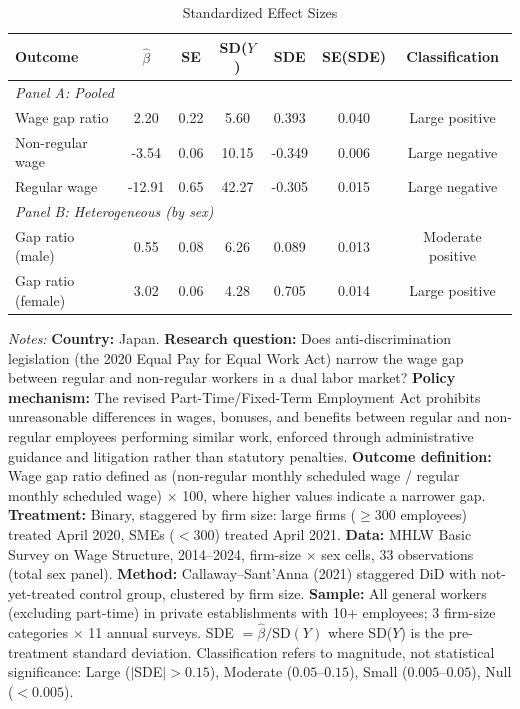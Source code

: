 \begin{table}[t]
\centering
\caption{Standardized Effect Sizes}
\label{tab:sde}
\begin{tabular}{lcccccc}
\toprule
Outcome & $\hat{\beta}$ & SE & SD($Y$) & SDE & SE(SDE) & Classification \\
\midrule
\multicolumn{7}{l}{\textit{Panel A: Pooled}} \\
Wage gap ratio & 2.20 & 0.22 & 5.60 & 0.393 & 0.040 & Large positive \\
Non-regular wage & -3.54 & 0.06 & 10.15 & -0.349 & 0.006 & Large negative \\
Regular wage & -12.91 & 0.65 & 42.27 & -0.305 & 0.015 & Large negative \\
\midrule
\multicolumn{7}{l}{\textit{Panel B: Heterogeneous (by sex)}} \\
Gap ratio (male) & 0.55 & 0.08 & 6.26 & 0.089 & 0.013 & Moderate positive \\
Gap ratio (female) & 3.02 & 0.06 & 4.28 & 0.705 & 0.014 & Large positive \\
\bottomrule
\end{tabular}
\begin{tablenotes}
\item \textit{Notes:} \textbf{Country:} Japan. \textbf{Research question:} Does anti-discrimination legislation (the 2020 Equal Pay for Equal Work Act) narrow the wage gap between regular and non-regular workers in a dual labor market? \textbf{Policy mechanism:} The revised Part-Time/Fixed-Term Employment Act prohibits unreasonable differences in wages, bonuses, and benefits between regular and non-regular employees performing similar work, enforced through administrative guidance and litigation rather than statutory penalties. \textbf{Outcome definition:} Wage gap ratio defined as (non-regular monthly scheduled wage / regular monthly scheduled wage) $\times$ 100, where higher values indicate a narrower gap. \textbf{Treatment:} Binary, staggered by firm size: large firms ($\geq$300 employees) treated April 2020, SMEs ($<$300) treated April 2021. \textbf{Data:} MHLW Basic Survey on Wage Structure, 2014--2024, firm-size $\times$ sex cells, 33 observations (total sex panel). \textbf{Method:} Callaway--Sant'Anna (2021) staggered DiD with not-yet-treated control group, clustered by firm size. \textbf{Sample:} All general workers (excluding part-time) in private establishments with 10+ employees; 3 firm-size categories $\times$ 11 annual surveys. SDE $= \hat{\beta} / \text{SD}(Y)$ where SD($Y$) is the pre-treatment standard deviation. Classification refers to magnitude, not statistical significance: Large ($|$SDE$| > 0.15$), Moderate ($0.05$--$0.15$), Small ($0.005$--$0.05$), Null ($< 0.005$).
\end{tablenotes}
\end{table}
